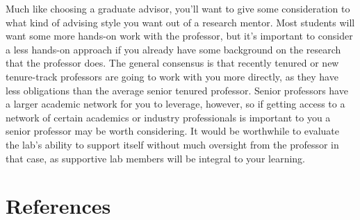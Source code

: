 \documentclass[12pt]{article}
\begin{document}
Much like choosing a graduate advisor, you'll want to give some consideration to what kind of advising style you want out of a research mentor. Most students will want some more hands-on work with the professor, but it's important to consider a less hands-on approach if you already have some background on the research that the professor does. The general consensus is that recently tenured or new tenure-track professors are going to work with you more directly, as they have less obligations than the average senior tenured professor. Senior professors have a larger academic network for you to leverage, however, so if getting access to a network of certain academics or industry professionals is important to you a senior professor may be worth considering. It would be worthwhile to evaluate the lab's ability to support itself without much oversight from the professor in that case, as supportive lab members will be integral to your learning.


\section{References}

\printbibliography[heading=none]
\end{document}
